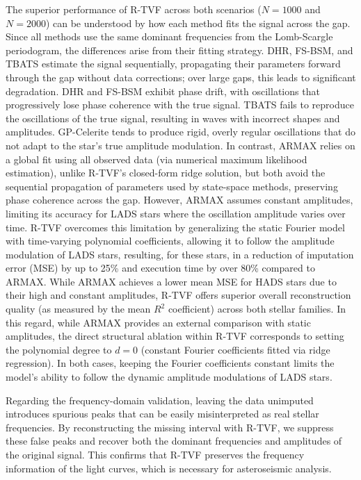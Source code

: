 \documentclass[a4paper,fleqn]{cas-sc}
\begin{document}
The superior performance of R-TVF across both scenarios ($N=1000$ and $N=2000$) can be understood by how each method fits the signal across the gap. Since all methods use the same dominant frequencies from the Lomb-Scargle periodogram, the differences arise from their fitting strategy. DHR, FS-BSM, and TBATS estimate the signal sequentially, propagating their parameters forward through the gap without data corrections; over large gaps, this leads to significant degradation. DHR and FS-BSM exhibit phase drift, with oscillations that progressively lose phase coherence with the true signal. TBATS fails to reproduce the oscillations of the true signal, resulting in waves with incorrect shapes and amplitudes. GP-Celerite tends to produce rigid, overly regular oscillations that do not adapt to the star's true amplitude modulation. In contrast, ARMAX relies on a global fit using all observed data (via numerical maximum likelihood estimation), unlike R-TVF's closed-form ridge solution, but both avoid the sequential propagation of parameters used by state-space methods, preserving phase coherence across the gap. However, ARMAX assumes constant amplitudes, limiting its accuracy for LADS stars where the oscillation amplitude varies over time. R-TVF overcomes this limitation by generalizing the static Fourier model with time-varying polynomial coefficients, allowing it to follow the amplitude modulation of LADS stars, resulting, for these stars, in a reduction of imputation error (MSE) by up to 25\% and execution time by over 80\% compared to ARMAX. While ARMAX achieves a lower mean MSE for HADS stars due to their high and constant amplitudes, R-TVF offers superior overall reconstruction quality (as measured by the mean $R^2$ coefficient) across both stellar families. {\color{blue}In this regard, while ARMAX provides an external comparison with static amplitudes, the direct structural ablation within R-TVF corresponds to setting the polynomial degree to $d=0$ (constant Fourier coefficients fitted via ridge regression). In both cases, keeping the Fourier coefficients constant limits the model's ability to follow the dynamic amplitude modulations of LADS stars.}%

{\color{blue}Regarding the frequency-domain validation, leaving the data unimputed introduces spurious peaks that can be easily misinterpreted as real stellar frequencies. By reconstructing the missing interval with R-TVF, we suppress these false peaks and recover both the dominant frequencies and amplitudes of the original signal. This confirms that R-TVF preserves the frequency information of the light curves, which is necessary for asteroseismic analysis.}
\end{document}
